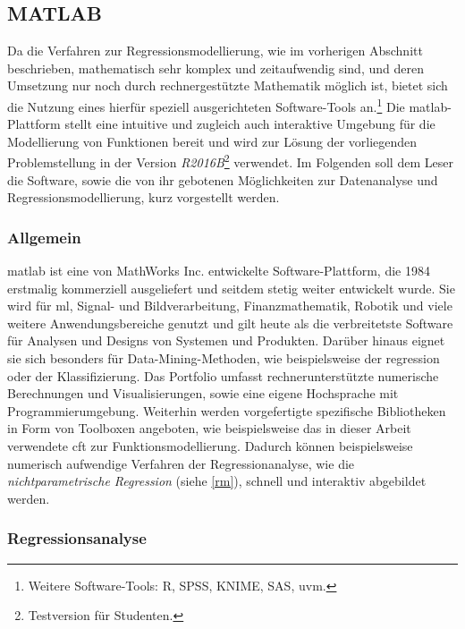 \subsection{MATLAB}
\label{matlab}

Da die Verfahren zur Regressionsmodellierung, wie im vorherigen Abschnitt beschrieben, mathematisch sehr komplex und zeitaufwendig sind, und deren Umsetzung nur noch durch rechnergestützte Mathematik möglich ist, bietet sich die Nutzung eines hierfür speziell ausgerichteten Software-Tools an.\footnote{Weitere Software-Tools: R, SPSS, KNIME, SAS, uvm.} Die \gls{matlab}-Plattform stellt eine intuitive und zugleich auch interaktive Umgebung für die Modellierung von Funktionen bereit und wird zur Lösung der vorliegenden Problemstellung in der Version \textit{R2016B}\footnote{Testversion für Studenten.} verwendet. Im Folgenden soll dem Leser die Software, sowie die von ihr gebotenen Möglichkeiten zur Datenanalyse und Regressionsmodellierung, kurz vorgestellt werden. 

\subsubsection{Allgemein}
\enlargethispage{\baselineskip}\gls{matlab} ist eine von MathWorks Inc. entwickelte Software-Plattform, die 1984 erstmalig kommerziell ausgeliefert und seitdem stetig weiter entwickelt wurde. Sie wird für \gls{ml}, Signal- und Bildverarbeitung, Finanzmathematik, Robotik und viele weitere Anwendungsbereiche genutzt und gilt heute als die verbreitetste Software für Analysen und Designs von Systemen und Produkten. Darüber hinaus eignet sie sich besonders für Data-Mining-Methoden, wie beispielsweise der \gls{regression} oder der Klassifizierung. Das Portfolio umfasst rechnerunterstützte numerische Berechnungen und Visualisierungen, sowie eine eigene Hochsprache mit Programmierumgebung. Weiterhin werden vorgefertigte spezifische Bibliotheken in Form von Toolboxen angeboten, wie beispielsweise das in dieser Arbeit verwendete \gls{cft} zur Funktionsmodellierung. Dadurch können beispielsweise numerisch aufwendige Verfahren der Regressionanalyse, wie die \textit{nichtparametrische Regression} (siehe \vref{rm}), schnell und interaktiv abgebildet werden. 

\subsubsection{Regressionsanalyse}
\label{matra}

